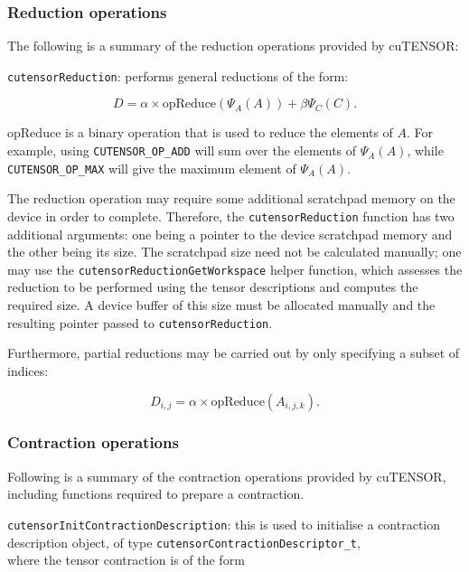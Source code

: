 \subsubsection{Reduction operations} \label{cutensor::reduction}
The following is a summary of the reduction operations provided by cuTENSOR:

\vspace{0.5em}\texttt{cutensorReduction}: performs general reductions of the form:

\begin{equation*}
D = \alpha \times \mathrm{opReduce}(\Psi_A(A)) + \beta \Psi_C(C).
\end{equation*}

\noindent $\mathrm{opReduce}$ is a binary operation that is used to reduce the elements of $A$. For example, using \texttt{CUTENSOR\_OP\_ADD} will sum over the elements of $\Psi_A(A)$, while \texttt{CUTENSOR\_OP\_MAX} will give the maximum element of $\Psi_A(A)$.

The reduction operation may require some additional scratchpad memory on the device in order to complete. Therefore, the \texttt{cutensorReduction} function has two additional arguments: one being a pointer to the device scratchpad memory and the other being its size. The scratchpad size need not be calculated manually; one may use the \texttt{cutensorReductionGetWorkspace} helper function, which assesses the reduction to be performed using the tensor descriptions and computes the required size. A device buffer of this size must be allocated manually and the resulting pointer passed to \texttt{cutensorReduction}.

Furthermore, partial reductions may be carried out by only specifying a subset of indices:

\begin{equation*}
D_{i,j} = \alpha \times \mathrm{opReduce}(A_{i,j,k}).
\end{equation*}

\subsubsection{Contraction operations} \label{cutensor::contraction}
Following is a summary of the contraction operations provided by cuTENSOR, including functions required to prepare a contraction.

\vspace{0.5em}\texttt{cutensorInitContractionDescription}: this is used to initialise a contraction description object, of type \texttt{cutensorContractionDescriptor\_t}, \\where the tensor contraction is of the form


